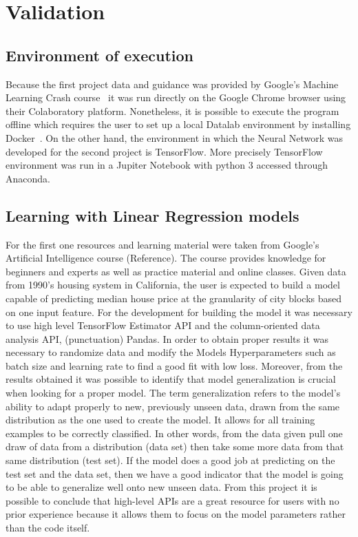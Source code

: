 

\section{Validation}
\label{sec:validation}



\subsection{Environment of execution}
Because the first project data and guidance was provided by Google's Machine Learning Crash course~\cite{mlchrome18}  it was run directly on the Google Chrome browser using their Colaboratory platform. Nonetheless, it is possible to execute the program offline which requires the user to set up a local Datalab environment by installing Docker~\cite{docker18}.   
On the other hand, the environment in which the Neural Network was developed for the second  project is TensorFlow. More precisely TensorFlow environment was run in a Jupiter Notebook with python 3 accessed through Anaconda. 

\subsection{Learning with Linear Regression models}

For the first one resources and learning material were taken from Google’s Artificial Intelligence course (Reference).  The course provides knowledge for beginners and experts as well as practice material and online classes. Given data from 1990’s housing system in California, the user is expected to build a model capable of predicting median house price at the granularity of city blocks based on one input feature. For the development for building the model it was necessary to use high level TensorFlow Estimator API and the column-oriented data analysis API, (punctuation) Pandas.  In order to obtain proper results it was necessary to randomize data and modify the Models Hyperparameters such as batch size 
and learning rate to find a good fit with low loss. Moreover, from the results obtained it was possible to identify that model generalization is crucial when looking for a proper model. The term generalization refers to the model’s ability to adapt properly to new, previously unseen data, drawn from the same distribution as the one used to create the model.  It allows for all training examples to be correctly classified. In other words, from the data given pull one draw of data from a distribution (data set) then take some more data from that same distribution (test set). If the model does a good job at predicting on the test set and the data set, then we have a good indicator that the model is going to be able to generalize well onto new unseen data.  From this project it is possible to conclude that high-level APIs are a great resource for users with no prior experience because it allows them to focus on the model parameters rather than the code itself. 


